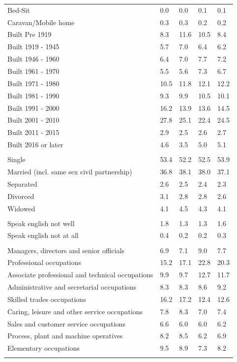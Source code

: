 \documentclass{article}
\begin{document}
\begin{table}[h]
\begin{tabular}{KTTTT}
Bed-Sit & 0.0& 0.0& 0.1& 0.1\\
Caravan/Mobile home & 0.3& 0.3& 0.2& 0.2\\
    \hline
Built Pre 1919 &  8.3& 11.6& 10.5&  8.4\\
Built 1919 - 1945 & 5.7& 7.0& 6.4& 6.2\\
Built  1946 - 1960 & 6.4& 7.0& 7.7& 7.2\\
Built  1961 - 1970 & 5.5& 5.6& 7.3& 6.7\\
Built  1971 - 1980 & 10.5& 11.8& 12.1& 12.2\\
Built  1981 - 1990 &  9.3&  9.9& 10.5& 10.1\\
Built  1991 - 2000 & 16.2& 13.9& 13.6& 14.5\\
Built  2001 - 2010 & 27.8& 25.1& 22.4& 24.5\\
Built  2011 - 2015 & 2.9& 2.5& 2.6& 2.7\\
Built  2016 or later & 4.6& 3.5& 5.0& 5.1\\
\hline
    \\
    \hline
Single & 53.4& 52.2& 52.5& 53.9\\
Married (incl. same sex civil partnership) & 36.8& 38.1& 38.0& 37.1\\
Separated  & 2.6& 2.5& 2.4& 2.3\\
Divorced  & 3.1& 2.8& 2.8& 2.6\\
Widowed & 4.1& 4.5& 4.3& 4.1\\
\hline
    \\ 
    \hline
Speak english not well & 1.8& 1.3& 1.3& 1.6\\
Speak english not at all & 0.4& 0.2& 0.2& 0.3\\
\hline
    \\
    \hline
Managers, directors and senior officials & 6.9& 7.1& 9.0& 7.7\\
Professional occupations & 15.2& 17.1& 22.8& 20.3\\
Associate professional and technical occupations &  9.9&  9.7& 12.7& 11.7\\
Administrative and secretarial occupations & 8.3& 8.3& 8.6& 9.2\\
Skilled trades occupations & 16.2& 17.2& 12.4& 12.6\\
Caring, leisure and other service occupations & 7.8& 8.3& 7.0& 7.4\\
Sales and customer service occupations & 6.6& 6.0& 6.0& 6.2\\
Process, plant and machine operatives & 8.2& 8.5& 6.2& 6.9\\
Elementary occupations & 9.5& 8.9& 7.3& 8.2\\
\hline
\end{tabular}
\end{table}
\end{document}
